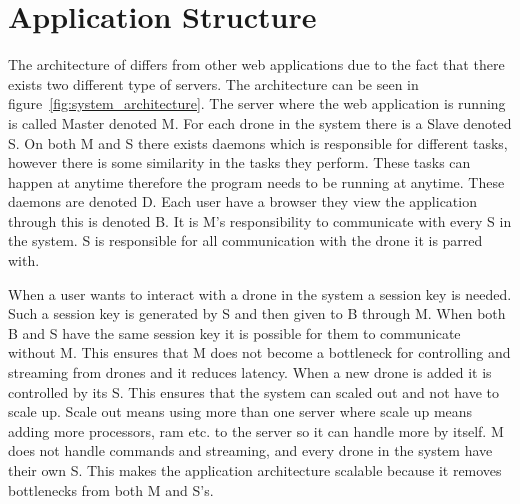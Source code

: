 \section{Application Structure}
\label{sec:application_structure}

The architecture of \projectname{} differs from other web applications due to the fact that there exists two different type of servers. 
The architecture can be seen in figure~\ref{fig:system_architecture}.
The server where the web application is running is called Master denoted M.
For each drone in the system there is a Slave denoted S. 
On both M and S there exists daemons which is responsible for different tasks, however there is some similarity in the tasks they perform.
These tasks can happen at anytime therefore the program needs to be running at anytime. These daemons are denoted D.
Each user have a browser they view the application through this is denoted B.
It is M's responsibility to communicate with every S in the system.
S is responsible for all communication with the drone it is parred with.

When a user wants to interact with a drone in the system a session key is needed.
Such a session key is generated by S and then given to B through M.
When both B and S have the same session key it is possible for them to communicate without M.
This ensures that M does not become a bottleneck for controlling and streaming from drones and it reduces latency.
When a new drone is added it is controlled by its S. This ensures that the system can scaled out and not have to scale up.
Scale out means using more than one server where scale up means adding more processors, ram etc. to the server so it can handle more by itself.
M does not handle commands and streaming, and every drone in the system have their own S.
This makes the application architecture scalable because it removes bottlenecks from both M and S's.

